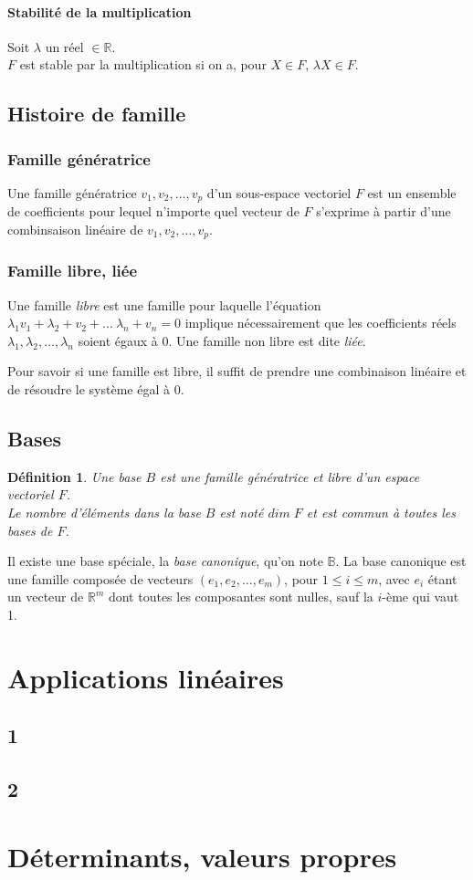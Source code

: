 \documentclass{report}
\newtheorem{mydef}{Définition}
\begin{document}
\subsubsection{Stabilité de la multiplication}
Soit $\lambda$ un réel $\in \mathbb{R}$.\\
$F$ est stable par la multiplication si on a, pour $X \in F$, $\lambda X \in F$.

\section{Histoire de famille}
\subsection{Famille génératrice}
Une famille génératrice ${v_1,v_2,\ldots,v_p}$ d'un sous-espace vectoriel $F$ est un ensemble de coefficients pour lequel n'importe quel vecteur de $F$ s'exprime à partir d'une combinsaison linéaire de ${v_1,v_2,\ldots,v_p}$.

\subsection{Famille libre, liée}
Une famille \emph{libre} est une famille pour laquelle l'équation ${\lambda_1 v_1 + \lambda_2 + v_2 + \ldots \ \lambda_n + v_n = 0}$ implique nécessairement que les coefficients réels $\lambda_1, \lambda_2, \ldots, \lambda_n$ soient égaux à $0$.
Une famille non libre est dite \emph{liée}.
\par
Pour savoir si une famille est libre, il suffit de prendre une combinaison linéaire et de résoudre le système égal à $0$.

\section{Bases}
\begin{mydef}
Une base $B$ est une famille génératrice et libre d'un espace vectoriel $F$.\\
Le nombre d'éléments dans la base $B$ est noté $dim \; F$ et est commun à toutes les bases de $F$.
\end{mydef}
Il existe une base spéciale, la \emph{base canonique}, qu'on note $\mathbb{B}$.
La base canonique est une famille composée de vecteurs $(e_1, e_2, \ldots, e_m)$, pour $1 \leq i \leq m$, avec $e_i$ étant un vecteur de $\mathbb{R}^m$ dont toutes les composantes sont nulles, sauf la $i$-ème qui vaut 1. 
\chapter{Applications linéaires}
\section{1}

\section{2}

\chapter{Déterminants, valeurs propres}



 
\end{document}
